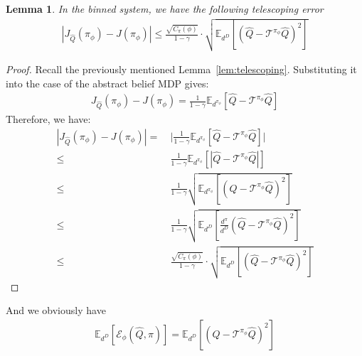 \documentclass[twoside]{article}
\newtheorem{lemma}{Lemma}
\newcommand{\CAL}[1]{\mathcal{#1}}
\newcommand{\zyh}[1]{{\color{blue}{ [\textbf{Youheng:}} #1]}}
\begin{document}
\begin{lemma}\label{lem:5-3}
In the binned system, we have the following telescoping error
    \begin{align}
        |J_{\hat{Q}}(\pi_\phi)-J(\pi_\phi)|\leq \frac{\sqrt{C_\pi(\phi)}}{1-\gamma}\cdot\sqrt{\mathbb{E}_{d^{D}}[(\hat{Q}-\mathcal{T}^{\pi_\phi}\hat{Q})^2]}
    \end{align}
\end{lemma}
\begin{proof}
Recall the previously mentioned Lemma~\ref{lem:telescoping}. Substituting it into the case of the abstract belief MDP gives:
\begin{align}
J_{\hat{Q}}(\pi_\phi)-J(\pi_\phi)=\frac{1}{1-\gamma}\mathbb{E}_{d^{\pi_\phi}}[\hat{Q}-\CAL{T}^{\pi_\phi}\hat{Q}]
\end{align}
Therefore, we have:
\begin{align}
|J_{\hat{Q}}(\pi_\phi)-J(\pi_\phi)|=&\ \bigg|\frac{1}{1-\gamma}\mathbb{E}_{d^{\pi_\phi}}[\hat{Q}-\CAL{T}^{\pi_\phi}\hat{Q}]\bigg|\nonumber\\
        \leq&\ \frac{1}{1-\gamma}\mathbb{E}_{d^{\pi_\phi}}[|\hat{Q}-\CAL{T}^{\pi_\phi}\hat{Q}|]\\
        \leq&\ \frac{1}{1-\gamma}\sqrt{\mathbb{E}_{d^{\pi_\phi}}[(\hat{Q}-\CAL{T}^{\pi_\phi}\hat{Q})^2]}\\
        \leq&\ \frac{1}{1-\gamma}\sqrt{\mathbb{E}_{d^{D}}[\frac{d^\pi}{d^D}(\hat{Q}-\CAL{T}^{\pi_\phi}\hat{Q})^2]}\\
        \leq&\ \frac{\sqrt{C_\pi(\phi)}}{1-\gamma}\cdot\sqrt{\mathbb{E}_{d^{D}}[(\hat{Q}-\mathcal{T}^{\pi_\phi}\hat{Q})^2]}
\end{align}
\end{proof}
And we obviously have
\begin{align}\label{equ:5-11}
    \mathbb{E}_{d^{D}}[\mathcal{E}_\phi(\hat{Q},\pi)]=\mathbb{E}_{d^{D}}[(\hat{Q}-\mathcal{T}^{\pi_\phi}\hat{Q})^2]
\end{align}


\end{document}
